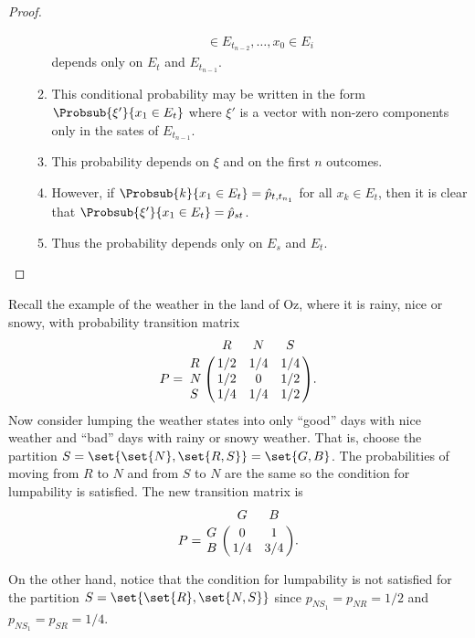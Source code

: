 \documentclass[12pt]{article}
\begin{document}
\begin{proof}
\begin{enumerate}
\begin{enumerate}
\begin{multline*}
{                        \in E_{t_{n-2}}, \dots,  x_0 \in
                        E_i}
                    \end{multline*} depends only on \( E_t \) and \( E_{t_{n-1}} \).
                \item
                    This conditional probability may be written in the
                    form \( \Probsub{\xi'}{x_1 \in E_t} \) where \( \xi'
                    \) is a vector with non-zero components only in the
                    sates of \( E_{t_{n-1}} \).
                \item
                    This probability depends on \( \xi \) and on the
                    first \( n \) outcomes.
                \item
                    However, if \( \Probsub{k}{x_1 \in E_t} = \hat{p}_{t,
                    t_{n_1}} \) for all \( x_k \in E_t \), then it is
                    clear that \( \Probsub{\xi'}{x_1 \in E_t} = \hat{p}_
                    {st} \).
                \item
                    Thus the probability depends only on \( E_s \) and \(
                    E_t \).
            \end{enumerate}
    \end{enumerate}
\end{proof}

\begin{example}
    Recall the example of the weather in the land of Oz, where it is
    rainy, nice or snowy, with probability transition matrix
    \[
        P = \bordermatrix{ & R & N & S \cr
        R & 1/2 & 1/4 & 1/4 \cr
        N & 1/2 & 0 & 1/2 \cr
        S & 1/4 & 1/4 & 1/2 }.
    \] Now consider lumping the weather states into only ``good'' days
    with nice weather and ``bad'' days with rainy or snowy weather.
    That is, choose the partition \( S = \set{ \set{N}, \set{R,S}} =
    \set{G, B} \). The probabilities of moving from \( R \) to \( N \)
    and from \( S \) to \( N \) are the same so the condition for
    lumpability is satisfied.  The new transition matrix is
    \[
      P = \bordermatrix{
          & G   & B \cr
        G & 0   & 1 \cr
        B & 1/4 & 3/4}.
    \]

    On the other hand, notice that the condition for lumpability is not
    satisfied for the partition \( S = \set{ \set{R}, \set{N, S}} \)
    since \( p_{N S_1} = p_{NR} = 1/2 \) and \( p_{N S_1} = p_{SR} = 1/4
    \).
  \end{example}
\end{document}
